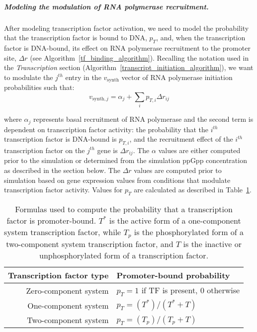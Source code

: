 \documentclass[12pt]{article}
\begin{document}
\subparagraph{Modeling the modulation of RNA polymerase recruitment.}
After modeling transcription factor activation, we need to model the probability that the transcription factor is bound to DNA, \(p_T\), and, when the transcription factor is DNA-bound, its effect on RNA polymerase recruitment to the promoter site, \(\Delta r\) (see Algorithm~\ref{tf_binding_algorithm}).  Recalling the notation used in the \textit{Transcription} section (Algorithm~\ref{transcript_initiation_algorithm}), we want to modulate the \(j^{th}\) entry in the \(v_\text{synth}\) vector of RNA polymerase initiation probabilities such that:
\begin{equation}
v_{\text{synth}, j} = \alpha_j + \sum_{i} p_{T, i} \Delta r_{i j}
\label{eq:vsynth}
\end{equation}

\noindent where \(\alpha_j\) represents basal recruitment of RNA polymerase and the second term is dependent on transcription factor activity: the probability that the \(i^{th}\) transcription factor is DNA-bound is \(p_{T, i}\), and the recruitment effect of the \(i^{th}\) transcription factor on the \(j^{th}\) gene is \(\Delta r_{i j}\).  The $\alpha$ values are either computed prior to the simulation or determined from the simulation ppGpp concentration as described in the section below. The \(\Delta r\) values are computed prior to simulation based on gene expression values from conditions that modulate transcription factor activity.  Values for \(p_T\) are calculated as described in Table~\ref{table:transcription_pt}.

\begin{table}[H]
\centering
\begin{tabular}{r l}
Transcription factor type & Promoter-bound probability \\
\hline
Zero-component system & \(p_T = 1\) if TF is present, \(0\) otherwise \\
One-component system & \(p_T = (T^*) / (T^* + T)\) \\
Two-component system & \(p_T = (T_p) / (T_p + T)\) \\
\end{tabular}
\caption[Formulas used to compute the probability that a transcription factor is promoter-bound.]{Formulas used to compute the probability that a transcription factor is promoter-bound. \(T^*\) is the active form of a one-component system transcription factor, while \(T_p\) is the phosphorylated form of a two-component system transcription factor, and \(T\) is the inactive or unphosphorylated form of a transcription factor.}
\label{table:transcription_pt}
\end{table}
\end{document}
